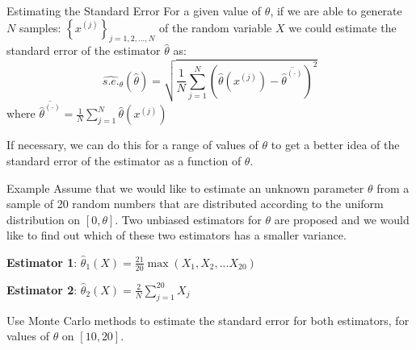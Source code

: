 \documentclass[8pt]{beamer}
\begin{document}
\begin{frame}{Estimating the Standard Error}
For a given value of $\theta$, if we are able to generate $N$ samples: $\left\{x^{(j)}\right\}_{j=1,2,...,N}$ of the random variable $X$ we could estimate the standard error of the estimator $\hat{\theta}$ as:
\begin{equation*}
	\widehat{s.e.}_{\theta}(\hat{\theta})=\sqrt{\frac{1}{N} \sum_{j=1}^N\left(\hat{\theta}(x^{(j)}) -\overline{\hat{\theta}^{(\cdot)}}\right)^2}
\end{equation*}
where $\overline{\hat{\theta}^{(\cdot)}}=\frac{1}{N} \sum_{j=1}^N\hat{\theta}(x^{(j)})$

If necessary, we can do this for a range of values of $\theta$ to get a better idea of the standard error of the estimator as a function of $\theta$. 
\end{frame}

\begin{frame}{Example} 
Assume that we would like to estimate an unknown parameter $\theta$ from a sample of 20 random numbers that are distributed according to the uniform distribution on $[0,\theta]$.
Two unbiased estimators for $\theta$ are proposed and we would like to find out which of these two estimators has a smaller variance.

\vspace{3mm}

\textbf{Estimator 1}: $\hat{\theta}_1(X)=\frac{21}{20}\max(X_1,X_2,...X_{20})$
\vspace{3mm}

\textbf{Estimator 2}: $\hat{\theta}_2(X)=\frac{2}{N} \sum_{j=1}^{20} X_j$

\vspace{3mm}

Use Monte Carlo methods to estimate the standard error for both estimators, for values of $\theta$ on $[10,20]$. 
\end{frame}
\end{document}
